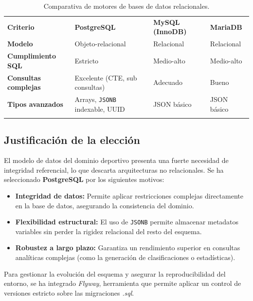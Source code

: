 \begin{table}[H]
    \renewcommand{\arraystretch}{1.25}
    \begin{tabularx}{\textwidth}{>{\RaggedRight\arraybackslash}p{1.9cm} >{\RaggedRight\arraybackslash}X >{\RaggedRight\arraybackslash}X >{\RaggedRight\arraybackslash}X}
        \textbf{Criterio} & \textbf{PostgreSQL} & \textbf{MySQL (InnoDB)} & \textbf{MariaDB} \\ \lightrule
        \textbf{Modelo} & Objeto-relacional & Relacional & Relacional \\ \lightrule
        \textbf{Cumplimiento SQL} & Estricto & Medio-alto & Medio-alto \\ \lightrule
        \textbf{Consultas complejas} & Excelente (CTE, sub consultas) & Adecuado & Bueno \\ \lightrule
        \textbf{Tipos avanzados} & Arrays, \texttt{JSONB} indexable, UUID & JSON básico & JSON básico \\ \lightrule
    \end{tabularx}
    \caption{Comparativa de motores de bases de datos relacionales.}
    \label{tab:comparativa-bd}
\end{table}

\subsection*{Justificación de la elección}

El modelo de datos del dominio deportivo presenta una fuerte necesidad de integridad referencial, lo que descarta arquitecturas no relacionales. Se ha seleccionado \textbf{PostgreSQL} por los siguientes motivos:
\begin{itemize}
    \item \textbf{Integridad de datos:} Permite aplicar restricciones complejas directamente en la base de datos, asegurando la consistencia del dominio.
    \item \textbf{Flexibilidad estructural:} El uso de \texttt{JSONB} permite almacenar metadatos variables sin perder la rigidez relacional del resto del esquema.
    \item \textbf{Robustez a largo plazo:} Garantiza un rendimiento superior en consultas analíticas complejas (como la generación de clasificaciones o estadísticas).
\end{itemize}

Para gestionar la evolución del esquema y asegurar la reproducibilidad del entorno, se ha integrado \emph{Flyway}, herramienta que permite aplicar un control de versiones estricto sobre las migraciones \emph{.sql}.

